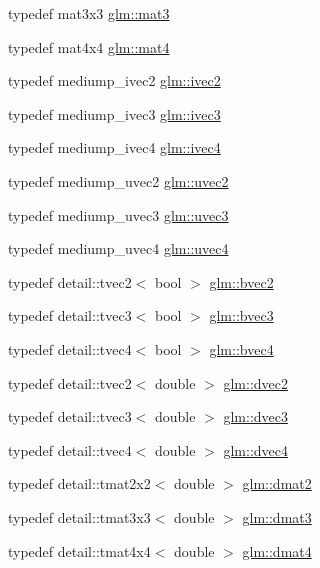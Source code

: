 \begin{DoxyCompactItemize}
\item 
typedef mat3x3 \hyperlink{group__core__types_gadfaff2a7dce5cbf4e77a47ecea42ac5b}{glm\+::mat3}
\item 
typedef mat4x4 \hyperlink{group__core__types_ga7dcd2365c2e368e6af5b7adeb6a9c8df}{glm\+::mat4}
\item 
typedef mediump\+\_\+ivec2 \hyperlink{group__core__types_ga606b9d298d8aaa55c449182c340b4622}{glm\+::ivec2}
\item 
typedef mediump\+\_\+ivec3 \hyperlink{group__core__types_ga620442eba2e3b49317b24fd6d141b0f8}{glm\+::ivec3}
\item 
typedef mediump\+\_\+ivec4 \hyperlink{group__core__types_ga997dbad029105eea19ccd8a1455a6fe3}{glm\+::ivec4}
\item 
typedef mediump\+\_\+uvec2 \hyperlink{group__core__types_gad0643cb47b927024ccf4979b0e9a903d}{glm\+::uvec2}
\item 
typedef mediump\+\_\+uvec3 \hyperlink{group__core__types_ga713379218af0a01d0a7b1e631066106c}{glm\+::uvec3}
\item 
typedef mediump\+\_\+uvec4 \hyperlink{group__core__types_gae85130f09c272fcd64da1353c09dddef}{glm\+::uvec4}
\item 
typedef detail\+::tvec2$<$ bool $>$ \hyperlink{group__core__types_ga0b5729ae4f7b2767a18bb96b7152c072}{glm\+::bvec2}
\item 
typedef detail\+::tvec3$<$ bool $>$ \hyperlink{group__core__types_gac192f5fbd7fcb78ca703d4684f323512}{glm\+::bvec3}
\item 
typedef detail\+::tvec4$<$ bool $>$ \hyperlink{group__core__types_ga8ec34c649bc4513202aff479486bbcea}{glm\+::bvec4}
\item 
typedef detail\+::tvec2$<$ double $>$ \hyperlink{group__core__types_gad9953f484cbb104e8675653ce61900cb}{glm\+::dvec2}
\item 
typedef detail\+::tvec3$<$ double $>$ \hyperlink{group__core__types_ga140a8656fbb8b19382f109c5d5869856}{glm\+::dvec3}
\item 
typedef detail\+::tvec4$<$ double $>$ \hyperlink{group__core__types_ga0127b78c4c51b270b2a2ef848c01b5d9}{glm\+::dvec4}
\item 
typedef detail\+::tmat2x2$<$ double $>$ \hyperlink{group__core__types_gaa53909085d199392937e3933af5410a1}{glm\+::dmat2}
\item 
typedef detail\+::tmat3x3$<$ double $>$ \hyperlink{group__core__types_ga557f8357220829c6a6a3e28640e33507}{glm\+::dmat3}
\item 
typedef detail\+::tmat4x4$<$ double $>$ \hyperlink{group__core__types_ga68b5efb5d529f9031481ef36f9babd96}{glm\+::dmat4}

\end{DoxyCompactItemize}
